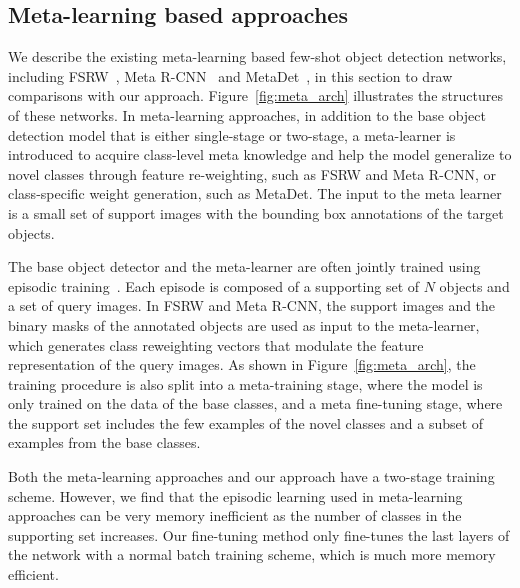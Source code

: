 \subsection{Meta-learning based approaches}
\label{sec:meta}
We describe the existing meta-learning based few-shot object detection networks, including FSRW~\cite{kang2019few}, Meta R-CNN~\cite{yan2019meta} and MetaDet~\cite{wang2019meta}, in 
this section to draw comparisons with our approach.
Figure~\ref{fig:meta_arch} illustrates the structures of these networks.
In meta-learning approaches, in addition to the base object detection model that is either single-stage or 
two-stage, a meta-learner is introduced to acquire class-level meta knowledge and
help the model generalize to novel classes through feature re-weighting, such as FSRW
and Meta R-CNN, or class-specific weight generation, such as MetaDet. The input to the
meta learner is a small set of support images with the bounding box annotations of the target objects. 

The base object detector and the meta-learner are often jointly trained using episodic training~\cite{vinyals2016matching}.
Each episode is composed of a supporting set of $N$ objects and a set of query images.
In FSRW and Meta R-CNN, the support images and the binary masks of the annotated objects are used as input to the meta-learner, which generates class reweighting vectors that modulate the feature representation of the query images.
As shown in Figure~\ref{fig:meta_arch}, the training procedure is also split into a meta-training stage, where the model is only trained on the data of the base classes, and a meta fine-tuning stage, where the support set includes the few examples of the novel classes and a subset of examples from the base classes.

Both the meta-learning approaches and our approach have a two-stage 
training scheme. However, we find that the episodic learning used in meta-learning approaches 
can be very memory inefficient as the number of classes in the supporting set increases. Our
fine-tuning method only fine-tunes the last layers of the network with a normal batch training scheme, which is much more memory efficient. 
